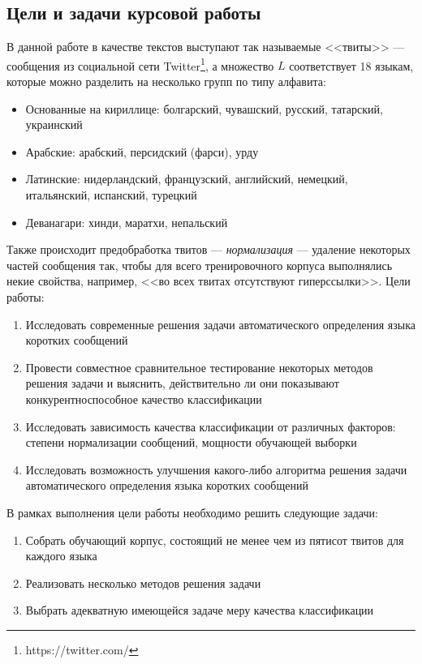 \documentclass[a4paper, 14pt]{article}
\begin{document}
		\subsection{Цели и задачи курсовой работы}
		В данной работе в качестве текстов выступают так называемые <<твиты>> --- сообщения из социальной сети Twitter\footnote{https://twitter.com/}, 
		а множество $L$ соответствует 18 языкам, которые можно разделить на несколько групп по типу алфавита:
		\begin{itemize}
			\item Основанные на кириллице: болгарский, чувашский, русский, татарский, украинский
			\item Арабские: арабский, персидский (фарси), урду
			\item Латинские: нидерландский, французский, английский, немецкий, итальянский, испанский, турецкий
			\item Деванагари: хинди, маратхи, непальский
		\end{itemize}
		Также происходит предобработка твитов --- \textit{нормализация} --- удаление некоторых частей сообщения так, чтобы для всего тренировочного корпуса выполнялись некие свойства, например, <<во всех твитах отсутствуют гиперссылки>>.
		Цели работы:
		\begin{enumerate}
			\item Исследовать современные решения задачи автоматического определения языка коротких сообщений
			\item Провести совместное сравнительное тестирование некоторых методов решения задачи и выяснить, действительно ли они показывают
			конкурентноспособное качество классификации
			\item Исследовать зависимость качества классификации от различных факторов: степени нормализации сообщений, мощности обучающей 
			выборки
			\item Исследовать возможность улучшения какого-либо алгоритма решения задачи автоматического определения языка коротких сообщений	
		\end{enumerate}
		В рамках выполнения цели работы необходимо решить следующие задачи:
		\begin{enumerate}
			\item Собрать обучающий корпус, состоящий не менее чем из пятисот твитов для каждого языка
			\item Реализовать несколько методов решения задачи
			\item Выбрать адекватную имеющейся задаче меру качества классификации
		\end{enumerate}
\end{document}
